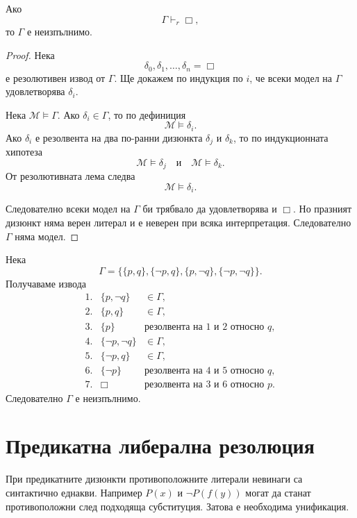 \begin{keythm}
Ако
\[
\Gamma\vdash_r\Box,
\]
то $\Gamma$ е неизпълнимо.
\end{keythm}

\begin{proof}
Нека
\[
\delta_0,\delta_1,\ldots,\delta_n=\Box
\]
е резолютивен извод от $\Gamma$. Ще докажем по индукция по $i$, че всеки модел на $\Gamma$ удовлетворява $\delta_i$.

Нека $\mathcal M\models\Gamma$. Ако $\delta_i\in\Gamma$, то по дефиниция
\[
\mathcal M\models\delta_i.
\]
Ако $\delta_i$ е резолвента на два по-ранни дизюнкта $\delta_j$ и $\delta_k$, то по индукционната хипотеза
\[
\mathcal M\models\delta_j
\quad\text{и}\quad
\mathcal M\models\delta_k.
\]
От резолютивната лема следва
\[
\mathcal M\models\delta_i.
\]

Следователно всеки модел на $\Gamma$ би трябвало да удовлетворява и $\Box$. Но празният дизюнкт няма верен литерал и е неверен при всяка интерпретация. Следователно $\Gamma$ няма модел.
\end{proof}

\begin{example}
Нека
\[
\Gamma=
\bigl\{
\{p,q\},
\{\neg p,q\},
\{p,\neg q\},
\{\neg p,\neg q\}
\bigr\}.
\]
Получаваме извода
\[
\begin{array}{rll}
1.&\{p,\neg q\} & \in\Gamma,\\
2.&\{p,q\} & \in\Gamma,\\
3.&\{p\} & \text{резолвента на 1 и 2 относно }q,\\
4.&\{\neg p,\neg q\} & \in\Gamma,\\
5.&\{\neg p,q\} & \in\Gamma,\\
6.&\{\neg p\} & \text{резолвента на 4 и 5 относно }q,\\
7.&\Box & \text{резолвента на 3 и 6 относно }p.
\end{array}
\]
Следователно $\Gamma$ е неизпълнимо.
\end{example}

\section{Предикатна либерална резолюция}\label{s:22.3}

При предикатните дизюнкти противоположните литерали невинаги са синтактично еднакви. Например $P(x)$ и $\neg P(f(y))$ могат да станат противоположни след подходяща субституция. Затова е необходима унификация.

